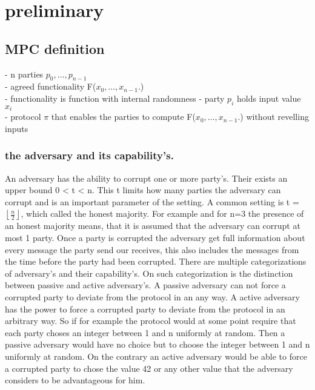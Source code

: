 \chapter{preliminary}
\section{MPC definition}
- n parties $ p_0,\dots,p_{n-1} $ \\
- agreed functionality F($ x_0,\dots,x_{n-1}. $) \\
- functionality is function with internal randomness 
- party $ p_i $ holds input value $ x_i $ \\
- protocol $ \pi $ that enables the parties to compute  F($ x_0,\dots,x_{n-1}. $) without revelling inputs \\ 





\subsection{the adversary and its capability's.}
 An adversary has the ability to corrupt one or more party's. Their exists an upper bound 0 < t < n. This t limits how many parties the adversary can corrupt and is an important parameter of the setting. A common setting is t = $\left \lfloor{ \frac{n}{2} }\right \rfloor  $, which called the honest majority. For example and for n=3 the presence of an honest majority means, that it is assumed that the adversary can corrupt at most 1 party.    
Once a party is corrupted the adversary get full information about every message the party send our receives, this also includes the messages from the time before the party had been corrupted. There are multiple categorizations of adversary's  and their capability's. On such categorization is the distinction between passive and active adversary's. A passive adversary can not force a corrupted party to deviate from the protocol in an any way. A active adversary has the power to force a corrupted party to deviate from the protocol in an arbitrary way. So if for example the protocol would at some point require that each party choses an integer between 1 and n uniformly at random.  Then a passive adversary would have no choice but to choose the integer between 1 and n uniformly at random. On the contrary an active adversary would be able to force a corrupted party to chose the value 42 or any other value that the adversary considers to be advantageous for him.\\





